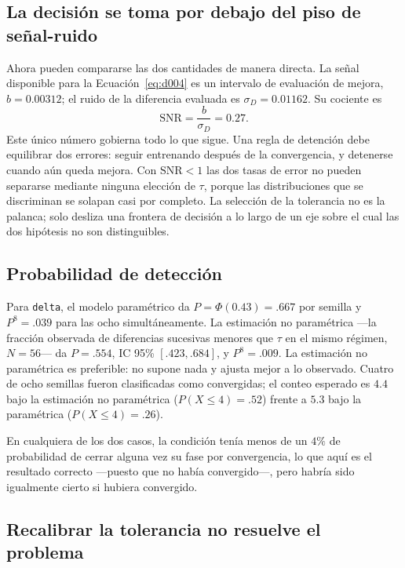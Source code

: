 \documentclass[jou,11pt,donotrepeattitle]{apa7}
\begin{document}
\subsection{La decisi\'on se toma por debajo del piso de se\~nal-ruido}

Ahora pueden compararse las dos cantidades de manera directa. La se\~nal disponible para la
Ecuaci\'on~\ref{eq:d004} es un intervalo de evaluaci\'on de mejora, $b = 0.00312$; el ruido de la
diferencia evaluada es $\sigma_D = 0.01162$. Su cociente es
%
\begin{equation}
\mathrm{SNR} = \frac{b}{\sigma_D} = 0.27 .
\label{eq:snr}
\end{equation}
%
Este \'unico n\'umero gobierna todo lo que sigue. Una regla de detenci\'on debe equilibrar dos
errores: seguir entrenando despu\'es de la convergencia, y detenerse cuando a\'un queda mejora.
Con $\mathrm{SNR} < 1$ las dos tasas de error no pueden separarse mediante ninguna elecci\'on de
$\tau$, porque las distribuciones que se discriminan se solapan casi por completo. La selecci\'on
de la tolerancia no es la palanca; solo desliza una frontera de decisi\'on a lo largo de un eje
sobre el cual las dos hip\'otesis no son distinguibles.

\subsection{Probabilidad de detecci\'on}

Para \texttt{delta}, el modelo param\'etrico da $P = \Phi(0.43) = .667$ por semilla y
$P^{8} = .039$ para las ocho simult\'aneamente. La estimaci\'on no param\'etrica ---la fracci\'on
observada de diferencias sucesivas menores que $\tau$ en el mismo r\'egimen, $N = 56$--- da
$P = .554$, IC 95\% $[.423, .684]$, y $P^{8} = .009$. La estimaci\'on no param\'etrica es
preferible: no supone nada y ajusta mejor a lo observado. Cuatro de ocho semillas fueron
clasificadas como convergidas; el conteo esperado es $4.4$ bajo la estimaci\'on no param\'etrica
($P(X \leq 4) = .52$) frente a $5.3$ bajo la param\'etrica ($P(X \leq 4) = .26$).

En cualquiera de los dos casos, la condici\'on ten\'ia menos de un $4\%$ de probabilidad de
cerrar alguna vez su fase por convergencia, lo que aqu\'i es el resultado correcto ---puesto que
no hab\'ia convergido---, pero habr\'ia sido igualmente cierto si hubiera convergido.

\subsection{Recalibrar la tolerancia no resuelve el problema}
\end{document}
